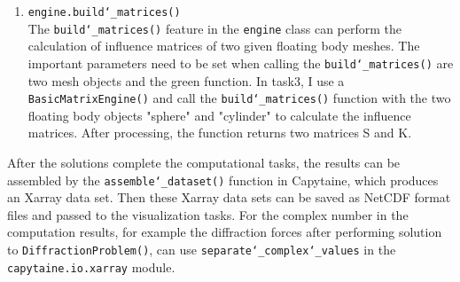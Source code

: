 \documentclass{article}
\begin{document}
\begin{enumerate}
    \item \texttt{engine.build\char`_matrices()}\\
    The \texttt{build\char`_matrices()} feature in the \texttt{engine} class can perform the calculation of influence matrices of two given floating body meshes. The important parameters need to be set when calling the \texttt{build\char`_matrices()} are two mesh objects and the green function. In task3, I use a \texttt{BasicMatrixEngine()} and call the \texttt{build\char`_matrices()} function with the two floating body objects "sphere" and "cylinder" to calculate the influence matrices. After processing, the function returns two matrices S and K.
\end{enumerate}
After the solutions complete the computational tasks, the results can be assembled by the \texttt{assemble\char`_dataset()} function in Capytaine, which produces an Xarray data set. Then these Xarray data sets can be saved as NetCDF format files and passed to the visualization tasks. For the complex number in the computation results, for example the diffraction forces after performing solution to \texttt{DiffractionProblem()}, can use \texttt{separate\char`_complex\char`_values} in the \texttt{capytaine.io.xarray} module\cite{documentation}.
\end{document}
